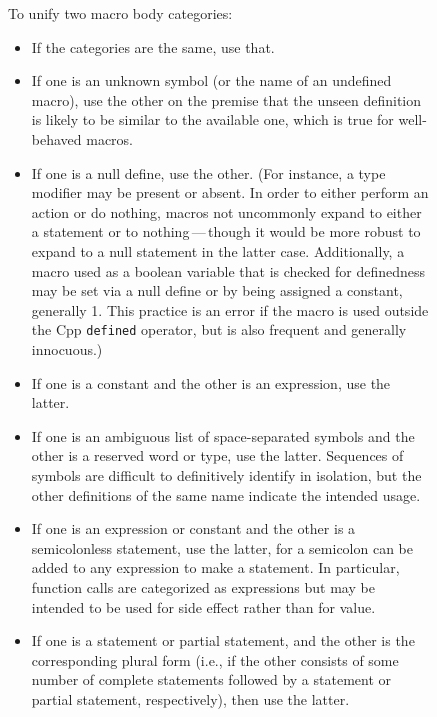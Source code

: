 \documentclass[10pt]{article}
\begin{document}
\begin{figure}
\small

\noindent
To unify two macro body categories:

\begin{itemize}\itemsep 0pt \parskip 0pt

\item If the categories are the same, use that.

\item If one is an unknown symbol (or the name of an undefined macro), use
  the other on the premise that the unseen definition is likely to be
  similar to the available one, which is true for well-behaved macros.

\item If one is a null define, use the other.  
  (For instance, a type modifier may be present or absent.  In order to
  either perform an action or do nothing, macros not uncommonly expand to
  either a statement or to nothing\,---\,though it would be more robust to
  expand to a null statement in the latter case.  Additionally, a macro
  used as a boolean variable that is checked for definedness may be set
  via a null define or by being assigned a constant, generally 1.  This
  practice is an error if the macro is used outside the Cpp {\tt defined}
  operator, but is also frequent and generally innocuous.)

\item If one is a constant and the other is an expression, use the latter.

\item If one is an ambiguous list of space-separated symbols and the other
  is a reserved word or type, use the latter.  Sequences of symbols are
  difficult to definitively identify in isolation, but the other
  definitions of the same name indicate the intended usage.

\item If one is an expression or constant and the other is a semicolonless
  statement, use the latter, for a semicolon can be added to any expression
  to make a statement.  In particular, function calls are categorized as
  expressions but may be intended to be used for side effect rather than
  for value.

\item
  If one is a statement or partial statement, and the other is the
  corresponding plural form (i.e., if the other consists of some number of
  complete statements followed by a statement or partial statement,
  respectively), then use the latter.


\end{itemize}
\end{figure}
\end{document}

